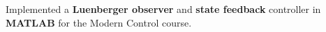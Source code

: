 \item{Implemented a \textbf{Luenberger observer} and \textbf{state feedback} controller in \textbf{MATLAB} for the Modern Control course.}

